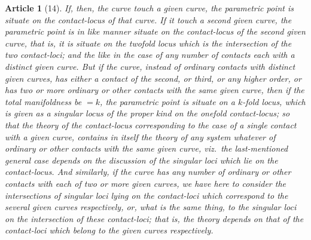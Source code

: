 \documentclass[11pt,a4paper]{article}
\theoremstyle{cayley}
\newtheorem{art}{Article}
\begin{document}
\begin{art}[14]
If, then, the curve touch a given curve, the parametric point is situate on the contact-locus of that curve. If it touch a second given curve, the parametric point is in like manner situate on the contact-locus of the second given curve, that is, it is situate on the twofold locus which is the intersection of the two contact-loci; and the like in the case of any number of contacts each with a distinct given curve. But if the curve, instead of ordinary contacts with distinct given curves, has either a contact of the second, or third, or any higher order, or has two or more ordinary or other contacts with the same given curve, then if the total manifoldness be $= k$, the parametric point is situate on a $k$-fold locus, which is given as a singular locus of the proper kind on the onefold contact-locus; so that the theory of the contact-locus corresponding to the case of a single contact with a given curve, contains in itself the theory of any system whatever of ordinary or other contacts with the same given curve, viz.\ the last-mentioned general case depends on the discussion of the singular loci which lie on the contact-locus. And similarly, if the curve has any number of ordinary or other contacts with each of two or more given curves, we have here to consider the intersections of singular loci lying on the contact-loci which correspond to the several given curves respectively, or, what is the same thing, to the singular loci on the intersection of these contact-loci; that is, the theory depends on that of the contact-loci which belong to the given curves respectively.
\end{art}
\end{document}
